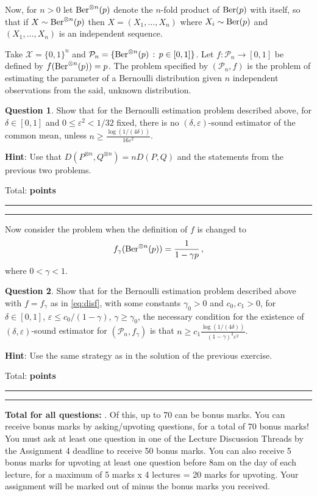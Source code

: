 \documentclass{article}
\newcommand{\cP}{\mathcal{P}}
\newcommand{\cX}{\mathcal{X}}
\DeclareMathOperator*{\1}{\mathbbm{1}}
\newcommand{\0}{\mathbf{0}}
\newcounter{DocPoints}
\newcounter{QuestionPoints}
\newcommand{\tpoints}[1]{        	\ifthenelse{\isempty{#1}}	{	}	{		\addtocounter{DocPoints}{#1}
		\addtocounter{QuestionPoints}{#1}
	}													 	\par\mbox{}\par\noindent\hfill {Total: \bf \arabic{QuestionPoints}\xspace points}\par\mbox{}\par\hrule\hrule
	\setcounter{QuestionPoints}{0}
}
\theoremstyle{definition}
\newtheorem{question}{Question}
\theoremstyle{remark}
\theoremstyle{theorem}
\newcommand{\hint}{\noindent \textbf{Hint}:\xspace}
\begin{document}
Now, for $n>0$ let $\text{Ber}^{\otimes n}(p)$ denote the $n$-fold product of $\text{Ber}(p)$ with itself, 
so that if $X\sim \text{Ber}^{\otimes n}(p)$ then $X = (X_1,\dots,X_n)$ where $X_i \sim \text{Ber}(p)$ and $(X_1,\dots,X_n)$ is an independent sequence.

Take $\cX = \{0,1\}^n$ and $\cP_n = \{ \Ber^{\otimes n}(p) \,:\, p\in [0,1] \}$.
Let $f:\cP_n \to [0,1]$ be defined by $f(\text{Ber}^{\otimes n}(p)) = p$.
The problem specified by $(\cP_n,f)$ is the problem of estimating the parameter 
of a Bernoulli distribution given $n$ independent observations from the said, unknown distribution.

\begin{question}
Show that for the Bernoulli estimation problem described above,
for $\delta\in [0,1]$ and $0\le \varepsilon^2<1/32$ fixed, there is no $(\delta,\varepsilon)$-sound estimator
of the common mean, unless
 $n\ge \frac{\log(1/(4\delta))}{16 \varepsilon^2} $.
  
\hint Use that $D(P^{\otimes n},Q^{\otimes n}) = n D(P,Q)$ and the statements from the previous two problems.
\tpoints{20}
\end{question}


Now consider the problem when the definition of $f$ is changed to 
\begin{align}
f_\gamma(\text{Ber}^{\otimes n}(p)) = \frac{1}{1-\gamma p}\,,
\label{eq:disf}
\end{align}
where $0<\gamma<1$.

\begin{question}
Show that for the Bernoulli estimation problem described above with $f=f_\gamma$ as in \cref{eq:disf},
with some constants $\gamma_0>0$ and $c_0,c_1>0$, 
for $\delta\in [0,1]$, $\varepsilon\le c_0/(1-\gamma)$, $\gamma\ge \gamma_0$,
the necessary condition for the existence of 
 $(\delta,\varepsilon)$-sound estimator for $(\cP_n,f_\gamma)$ is 
that
 $n\ge c_1 \frac{\log(1/(4\delta))}{(1-\gamma)^3 \varepsilon^2}$.
 
\hint Use the same strategy as in the solution of the previous exercise.
\tpoints{40}
\end{question}





\bigskip
\bigskip

\noindent
\textbf{
Total for all questions: }.
Of this, up to 70 can be bonus marks. You can receive bonus marks by asking/upvoting questions, for a total of 70 bonus marks!
You must ask at least one question in one of the Lecture Discussion Threads by the Assignment 4 deadline to receive 50 bonus marks.
You can also receive 5 bonus marks for upvoting at least one question before 8am on the day of each lecture, for a maximum of 5 marks x 4 lectures = 20 marks for upvoting.
Your assignment will be marked out of  minus the bonus marks you received.
\end{document}
